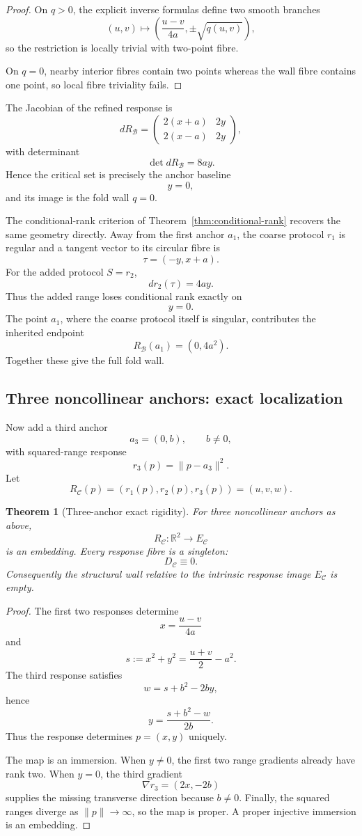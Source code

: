 \documentclass[11pt]{article}
\newtheorem{theorem}[definition]{Theorem}
\newcommand{\Bcal}{\mathcal B}
\begin{document}
\begin{proof}
On \(q>0\), the explicit inverse formulas define two smooth branches
\[
(u,v)\longmapsto
\left(
\frac{u-v}{4a},
\pm\sqrt{q(u,v)}
\right),
\]
so the restriction is locally trivial with two-point fibre.

On \(q=0\), nearby interior fibres contain two points whereas the wall fibre
contains one point, so local fibre triviality fails.
\end{proof}

The Jacobian of the refined response is
\[
dR_{\Bcal}
=
\begin{pmatrix}
2(x+a) & 2y\\
2(x-a) & 2y
\end{pmatrix},
\]
with determinant
\[
\det dR_{\Bcal}=8ay.
\]
Hence the critical set is precisely the anchor baseline
\[
y=0,
\]
and its image is the fold wall \(q=0\).

The conditional-rank criterion of
Theorem~\ref{thm:conditional-rank} recovers the same geometry directly.
Away from the first anchor \(a_1\), the coarse protocol \(r_1\) is regular and
a tangent vector to its circular fibre is
\[
\tau=(-y,x+a).
\]
For the added protocol \(S=r_2\),
\[
dr_2(\tau)=4ay.
\]
Thus the added range loses conditional rank exactly on
\[
y=0.
\]
The point \(a_1\), where the coarse protocol itself is singular, contributes
the inherited endpoint
\[
R_{\Bcal}(a_1)=(0,4a^2).
\]
Together these give the full fold wall.

\subsection{Three noncollinear anchors: exact localization}

Now add a third anchor
\[
a_3=(0,b),
\qquad
b\neq0,
\]
with squared-range response
\[
r_3(p)=\|p-a_3\|^2.
\]
Let
\[
R_{\mathcal C}(p)
=
(r_1(p),r_2(p),r_3(p))
=
(u,v,w).
\]

\begin{theorem}[Three-anchor exact rigidity]
For three noncollinear anchors as above,
\[
R_{\mathcal C}:\mathbb R^2\to E_{\mathcal C}
\]
is an embedding. Every response fibre is a singleton:
\[
D_{\mathcal C}\equiv0.
\]
Consequently the structural wall relative to the intrinsic response image
\(E_{\mathcal C}\) is empty.
\end{theorem}

\begin{proof}
The first two responses determine
\[
x=\frac{u-v}{4a}
\]
and
\[
s:=x^2+y^2
=
\frac{u+v}{2}-a^2.
\]
The third response satisfies
\[
w=s+b^2-2by,
\]
hence
\[
y=
\frac{s+b^2-w}{2b}.
\]
Thus the response determines \(p=(x,y)\) uniquely.

The map is an immersion. When \(y\neq0\), the first two range gradients already
have rank two. When \(y=0\), the third gradient
\[
\nabla r_3=(2x,-2b)
\]
supplies the missing transverse direction because \(b\neq0\).
Finally, the squared ranges diverge as \(\|p\|\to\infty\), so the map is
proper. A proper injective immersion is an embedding.
\end{proof}
\end{document}
